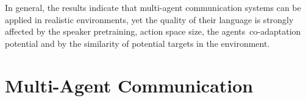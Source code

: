 In general, the results indicate that multi-agent communication systems can be applied in realistic environments, yet the quality of their language is strongly affected by the speaker pretraining, action space size, the agents\ co-adaptation potential and by the similarity of potential targets in the environment.

\section{Multi-Agent Communication}

